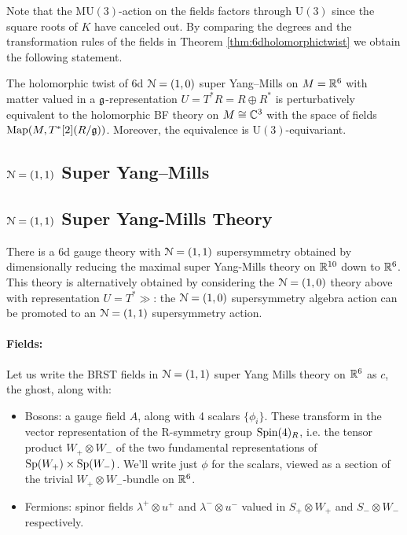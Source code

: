 \documentclass[10pt, oneside]{article}
\newcommand{\MU}{\mathrm{MU}}
\renewcommand{\U}{\mathrm{U}}
\begin{document}
Note that the $\MU(3)$-action on the fields factors through $\U(3)$ since the square roots of $K$ have canceled out. By comparing the degrees and the transformation rules of the fields in Theorem \ref{thm:6dholomorphictwist} we obtain the following statement.

\begin{thm}
The holomorphic twist of 6d $\mathcal N=(1, 0)$ super Yang--Mills on $M=\mathbb R^6$ with matter valued in a $\mathfrak g$-representation $U=T^*R=R\oplus R^*$ is perturbatively equivalent to the holomorphic BF theory on $M\cong \mathbb C^3$ with the space of fields $\operatorname{Map}(M, T^*[2] (R/\mathfrak g))$. Moreover, the equivalence is $\U(3)$-equivariant.
\label{thm:6dholomorphictwistgraded}
\end{thm}

\subsection{\texorpdfstring{$\mathcal N=(1, 1)$}{N=(1, 1)} Super Yang--Mills}

\subsection{\texorpdfstring{$\mathcal{N} = (1,1)$}{N=(1,1)} Super Yang-Mills Theory}

There is a 6d gauge theory with $\mathcal{N}=(1,1)$ supersymmetry obtained by dimensionally reducing the maximal super Yang-Mills theory on $\mathbb R^{10}$ down to $\mathbb R^6$. This theory is alternatively obtained by considering the $\mathcal{N}=(1,0)$ theory above with representation $U = T^*\gg$: the $\mathcal{N}=(1,0)$ supersymmetry algebra action can be promoted to an $\mathcal{N}=(1,1)$ supersymmetry action.  

\vspace{-10pt}
\paragraph{Fields:} Let us write the BRST fields in $\mathcal{N}=(1,1)$ super Yang Mills theory on $\mathbb R^6$ as $c$, the ghost, along with:
\begin{itemize}
 \item Bosons: a gauge field $A$, along with 4 scalars $\{\phi_i\}$.  These transform in the vector representation of the R-symmetry group $\mathrm{Spin}(4)_R$, i.e. the tensor product $W_+ \otimes W_-$ of the two fundamental representations of $\mathrm{Sp}(W_+) \times \mathrm{Sp}(W_-)$.  We'll write just $\phi$ for the scalars, viewed as a section of the trivial $W_+ \otimes W_-$-bundle on $\mathbb R^6$.
 \item Fermions: spinor fields $\lambda^+ \otimes u^+$ and $\lambda^- \otimes u^-$ valued in $S_+ \otimes W_+$ and $S_- \otimes W_-$ respectively.
\end{itemize}
\end{document}

